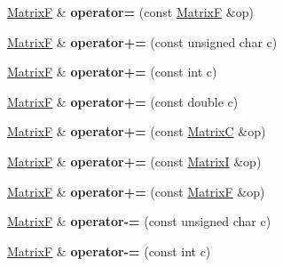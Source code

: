 \begin{DoxyCompactItemize}
\item 
\hypertarget{class_matrix_f_a95ad4df9dff4b518b98877f7fbc255c0}{\hyperlink{class_matrix_f}{Matrix\+F} \& {\bfseries operator=} (const \hyperlink{class_matrix_f}{Matrix\+F} \&op)}\label{class_matrix_f_a95ad4df9dff4b518b98877f7fbc255c0}

\item 
\hypertarget{class_matrix_f_ab175008aa674baa4ef23ef83cd220223}{\hyperlink{class_matrix_f}{Matrix\+F} \& {\bfseries operator+=} (const unsigned char c)}\label{class_matrix_f_ab175008aa674baa4ef23ef83cd220223}

\item 
\hypertarget{class_matrix_f_a920f7538a41b376ca7fa718435294379}{\hyperlink{class_matrix_f}{Matrix\+F} \& {\bfseries operator+=} (const int c)}\label{class_matrix_f_a920f7538a41b376ca7fa718435294379}

\item 
\hypertarget{class_matrix_f_a0a79e11cd5bb5686d015c197c49feaac}{\hyperlink{class_matrix_f}{Matrix\+F} \& {\bfseries operator+=} (const double c)}\label{class_matrix_f_a0a79e11cd5bb5686d015c197c49feaac}

\item 
\hypertarget{class_matrix_f_ae9289523b7f8b2a11556e841bebf93f3}{\hyperlink{class_matrix_f}{Matrix\+F} \& {\bfseries operator+=} (const \hyperlink{class_matrix_c}{Matrix\+C} \&op)}\label{class_matrix_f_ae9289523b7f8b2a11556e841bebf93f3}

\item 
\hypertarget{class_matrix_f_a9cd2a232ee3ea72054423008d5d811eb}{\hyperlink{class_matrix_f}{Matrix\+F} \& {\bfseries operator+=} (const \hyperlink{class_matrix_i}{Matrix\+I} \&op)}\label{class_matrix_f_a9cd2a232ee3ea72054423008d5d811eb}

\item 
\hypertarget{class_matrix_f_a755331d1e0302e8d52de8e7d49ede16a}{\hyperlink{class_matrix_f}{Matrix\+F} \& {\bfseries operator+=} (const \hyperlink{class_matrix_f}{Matrix\+F} \&op)}\label{class_matrix_f_a755331d1e0302e8d52de8e7d49ede16a}

\item 
\hypertarget{class_matrix_f_adb56970cce7ab87ee7f878106d77cb4e}{\hyperlink{class_matrix_f}{Matrix\+F} \& {\bfseries operator-\/=} (const unsigned char c)}\label{class_matrix_f_adb56970cce7ab87ee7f878106d77cb4e}

\item 
\hypertarget{class_matrix_f_a1487009dfe7f8255b01b7e064b5b746c}{\hyperlink{class_matrix_f}{Matrix\+F} \& {\bfseries operator-\/=} (const int c)}\label{class_matrix_f_a1487009dfe7f8255b01b7e064b5b746c}


\end{DoxyCompactItemize}
